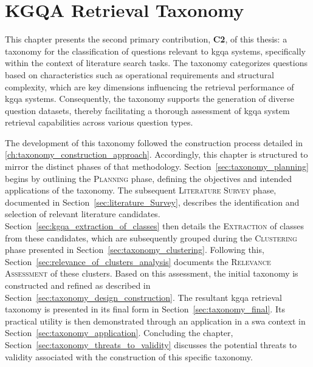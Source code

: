 \chapter{KGQA Retrieval Taxonomy}
\label{ch:question_catalog}

This chapter presents the second primary contribution, \textbf{C2}, of this thesis: a taxonomy for the classification of questions relevant to \gls{kgqa} systems, specifically within the context of literature search tasks. The taxonomy categorizes questions based on characteristics such as operational requirements and structural complexity, which are key dimensions influencing the retrieval performance of \gls{kgqa} systems. Consequently, the taxonomy supports the generation of diverse question datasets, thereby facilitating a thorough assessment of \gls{kgqa} system retrieval capabilities across various question types.

The development of this taxonomy followed the construction process detailed in \autoref{ch:taxonomy_construction_approach}. Accordingly, this chapter is structured to mirror the distinct phases of that methodology. Section~\ref{sec:taxonomy_planning} begins by outlining the \textsc{Planning} phase, defining the objectives and intended applications of the taxonomy. The subsequent \textsc{Literature Survey} phase, documented in Section~\ref{sec:literature_Survey}, describes the identification and selection of relevant literature candidates. Section~\ref{sec:kgqa_extraction_of_classes} then details the \textsc{Extraction} of classes from these candidates, which are subsequently grouped during the \textsc{Clustering} phase presented in Section~\ref{sec:taxonomy_clustering}. Following this, Section~\ref{sec:relevance_of_clusters_analysis} documents the \textsc{Relevance Assessment} of these clusters. Based on this assessment, the initial taxonomy is constructed and refined as described in Section~\ref{sec:taxonomy_design_construction}. The resultant \gls{kgqa} retrieval taxonomy is presented in its final form in Section~\ref{sec:taxonomy_final}. Its practical utility is then demonstrated through an application in a \gls{swa} context in Section~\ref{sec:taxonomy_application}. Concluding the chapter, Section~\ref{sec:taxonomy_threats_to_validity} discusses the potential threats to validity associated with the construction of this specific taxonomy.










